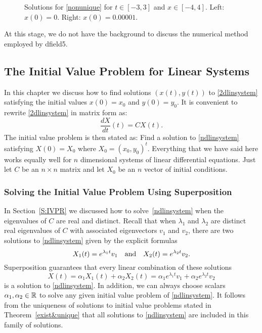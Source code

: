 \documentclass{ximera}
\begin{document}
\begin{figure*}[htb]
        \centerline{%
	}
        \caption{Solutions for \protect\eqref{nonunique}
              for $t\in [-3,3]$ and $x\in [-4,4]$. Left: $x(0)=0$.
	      Right: $x(0)=0.00001$.}
        \label{nonuniquefig}
\end{figure*}

At this stage, we do not have the background to discuss the numerical
method employed by {\sf dfield5}.

\subsection*{The Initial Value Problem for Linear Systems}

In this chapter we discuss how to find solutions $(x(t),y(t))$ to
\eqref{2dlinsystem} satisfying the initial values $x(0)=x_0$ and $y(0)=y_0$.
It is convenient to rewrite \eqref{2dlinsystem} in matrix form as:
\begin{equation} \label{ndlinsystem}
\frac{dX}{dt}(t) = CX(t).
\end{equation}
The initial value problem is then stated as:  Find a solution to
\eqref{ndlinsystem} satisfying $X(0)=X_0$ where $X_0=(x_0,y_0)^t$.
Everything that we have said here works equally well for $n$
dimensional systems of linear differential equations.  Just let
$C$ be an $n\times n$ matrix and let $X_0$ be an $n$ vector
of initial conditions.

\subsubsection*{Solving the Initial Value Problem Using Superposition}

In Section~\ref{S:IVPR} we discussed how to solve~\eqref{ndlinsystem} when the
eigenvalues of $C$ are real and distinct.  Recall that when $\lambda_1$ and
$\lambda_2$ are distinct real eigenvalues of $C$ with associated
eigenvectors $v_1$ and $v_2$, there are two solutions to \eqref{ndlinsystem}
given by the explicit formulas
\[
X_1(t) = e^{\lambda_1 t}v_1 \quad\mbox{and}\quad X_2(t) = e^{\lambda_2 t}v_2.
\]
Superposition guarantees that every linear combination of these solutions
\[
X(t) = \alpha_1X_1(t)+\alpha_2X_2(t) =
\alpha_1e^{\lambda_1 t}v_1 + \alpha_2e^{\lambda_2 t}v_2
\]
is a solution to \eqref{ndlinsystem}.  In addition, we can always choose
scalars $\alpha_1,\alpha_2\in\mbox{$\Bbb{R}$}$ to solve any given initial value problem
of \eqref{ndlinsystem}.   It follows from the uniqueness of solutions to
initial value problems stated in Theorem~\ref{exist&unique} that all
solutions to \eqref{ndlinsystem} are included in this family of solutions.
\end{document}
